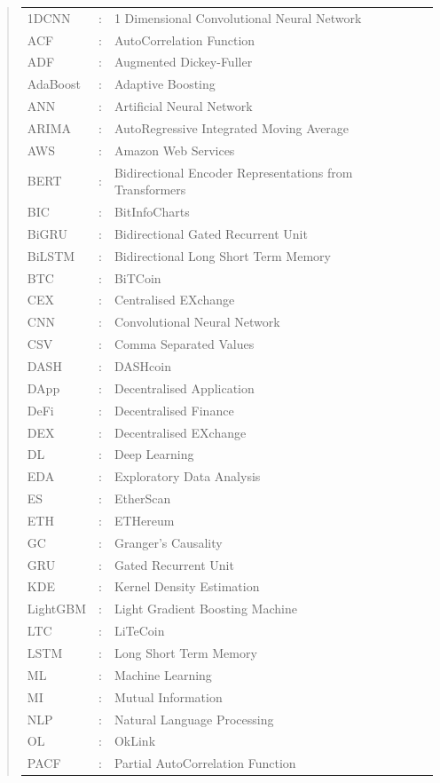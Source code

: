 \documentclass[ %
                    author={Raj Dhakan},
                supervisor={Dr. Ayush Joshi},
                    degree={MSc},
                     title={Ethereum Price Prediction using Internal and External Factors},
                  subtitle={},
                      type={},
                      year={2025}]{dissertation}
\begin{document}
\begin{quote}
\noindent
\begin{tabular}{lcl}
1DCNN&:& 1 Dimensional Convolutional Neural Network\\
ACF&:& AutoCorrelation Function\\
ADF&:& Augmented Dickey-Fuller\\
AdaBoost&:& Adaptive Boosting\\
ANN&:& Artificial Neural Network\\
ARIMA&:& AutoRegressive Integrated Moving Average\\
AWS&:& Amazon Web Services\\
BERT&:& Bidirectional Encoder Representations from Transformers\\
BIC&:& BitInfoCharts\\
BiGRU&:& Bidirectional Gated Recurrent Unit\\
BiLSTM&:& Bidirectional Long Short Term Memory\\
BTC&:& BiTCoin\\
CEX&:& Centralised EXchange\\
CNN&:& Convolutional Neural Network\\
CSV&:& Comma Separated Values\\
DASH&:&DASHcoin\\
DApp&:& Decentralised Application\\
DeFi&:& Decentralised Finance\\
DEX&:& Decentralised EXchange\\
DL&:& Deep Learning\\
EDA&:& Exploratory Data Analysis\\
ES&:& EtherScan\\
ETH&:& ETHereum\\
GC&:& Granger's Causality\\
GRU&:& Gated Recurrent Unit\\
KDE&:& Kernel Density Estimation\\
LightGBM&:& Light Gradient Boosting Machine\\
LTC&:&LiTeCoin\\
LSTM&:& Long Short Term Memory\\
ML&:& Machine Learning\\
MI&:& Mutual Information\\
NLP&:& Natural Language Processing\\
OL&:& OkLink\\
PACF&:& Partial AutoCorrelation Function\\

\end{tabular}
\end{quote}
\end{document}
